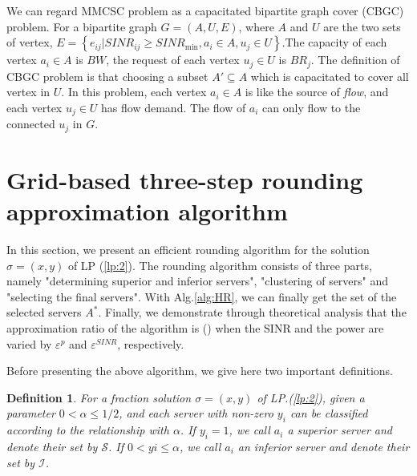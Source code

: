 \documentclass[journal]{IEEEtran}
\newtheorem{definition}{Definition}
\begin{document}
We can regard MMCSC problem as a capacitated bipartite graph cover (CBGC) problem. For a bipartite graph $G=(A,U,E)$, where $A$ and $U$ are the two sets of vertex, $E = \left\{ e_{ij} | SINR_{ij} \ge SINR_{\min}, a_i \in A, u_j \in U\right\}$.The capacity of each vertex $a_i \in A$ is $BW$, the request of each vertex $u_j \in U$ is $BR_j$. The definition of CBGC problem is that choosing a subset $A' \subseteq A$ which is capacitated to cover all vertex in $U$. In this problem, each vertex $a_i \in A$ is like the source of \emph{flow}, and each vertex $u_j \in U$ has flow demand. The flow of $a_i$ can only flow to the connected $u_j$ in $G$. 

\section{Grid-based three-step rounding approximation algorithm}
In this section, we present an efficient rounding algorithm for the solution $\sigma=(x,y)$ of LP (\ref{lp:2}). The rounding algorithm consists of three parts, namely "determining superior and inferior servers", "clustering of servers" and "selecting the final servers". With Alg.\ref{alg:HR}, we can finally get the set of the selected servers $A^*$. Finally, we demonstrate through theoretical analysis that the approximation ratio of the algorithm is () when the SINR and the power are varied by $\varepsilon^p$ and $\varepsilon^{SINR}$, respectively.


Before presenting the above algorithm, we give here two important definitions. 

\begin{definition}
	For a fraction solution $\sigma=(x,y)$ of LP.(\ref{lp:2}),  given a parameter $0<\alpha\le1/2$, and each server with non-zero $y_i$ can be classified according to the relationship with $\alpha$. If $y_i=1$, we call $a_i$ a superior server and denote their set by $\mathcal{S}$. If $0< yi\le \alpha$, we call $a_i$ an inferior server and denote their set by $\mathcal{I}$.
\end{definition}
\end{document}
